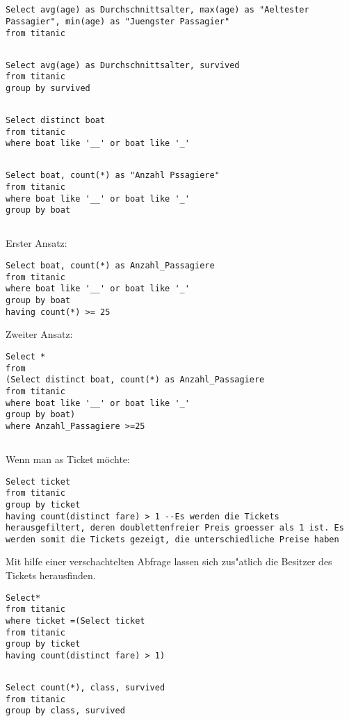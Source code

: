 \documentclass[a4paper, 11pt, titlepage]{article}
\begin{document}
\subsection{}
\begin{lstlisting}[style = sql]
Select avg(age) as Durchschnittsalter, max(age) as "Aeltester Passagier", min(age) as "Juengster Passagier"
from titanic
\end{lstlisting}
\subsection{}
\begin{lstlisting}[style = sql]
Select avg(age) as Durchschnittsalter, survived
from titanic
group by survived
\end{lstlisting}
\subsection{}
\begin{lstlisting}[style = sql]
Select distinct boat
from titanic
where boat like '__' or boat like '_'
\end{lstlisting}
\subsection{}
\begin{lstlisting}[style = sql]
Select boat, count(*) as "Anzahl Pssagiere"
from titanic
where boat like '__' or boat like '_'
group by boat
\end{lstlisting}
\subsection{}
Erster Ansatz:
\begin{lstlisting}[style = sql]
Select boat, count(*) as Anzahl_Passagiere
from titanic
where boat like '__' or boat like '_'
group by boat
having count(*) >= 25
\end{lstlisting}
Zweiter Ansatz:
\begin{lstlisting}[style = sql]
Select *
from 
(Select distinct boat, count(*) as Anzahl_Passagiere
from titanic
where boat like '__' or boat like '_'
group by boat) 
where Anzahl_Passagiere >=25
\end{lstlisting}
\subsection{}
Wenn man as Ticket möchte: 
\begin{lstlisting}[style = sql]
Select ticket
from titanic
group by ticket
having count(distinct fare) > 1 --Es werden die Tickets herausgefiltert, deren doublettenfreier Preis groesser als 1 ist. Es werden somit die Tickets gezeigt, die unterschiedliche Preise haben
\end{lstlisting}
Mit hilfe einer verschachtelten Abfrage lassen sich zus"atlich die Besitzer des Tickets herausfinden.
\begin{lstlisting}[style = sql]
Select*
from titanic
where ticket =(Select ticket
from titanic
group by ticket
having count(distinct fare) > 1)
\end{lstlisting}
\subsection{}
\begin{lstlisting}[style = sql]
Select count(*), class, survived
from titanic
group by class, survived
\end{lstlisting}
\end{document}
